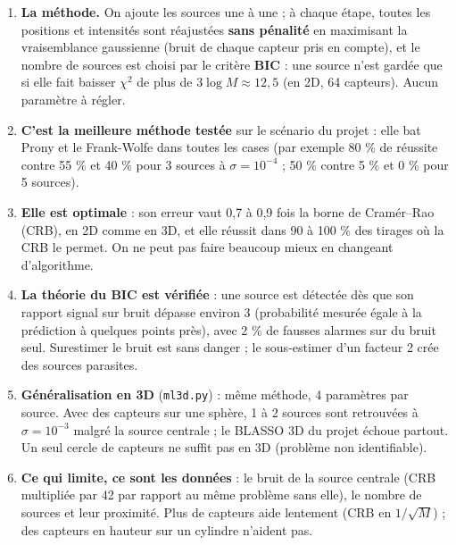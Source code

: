 \documentclass[
  french,
]{article}
\providecommand{\tightlist}{%
  \setlength{\itemsep}{0pt}\setlength{\parskip}{0pt}}
\begin{document}
\begin{enumerate}
\def\labelenumi{\arabic{enumi}.}
\tightlist
\item
  \textbf{La méthode.} On ajoute les sources une à une ; à chaque étape,
  toutes les positions et intensités sont réajustées \textbf{sans
  pénalité} en maximisant la vraisemblance gaussienne (bruit de chaque
  capteur pris en compte), et le nombre de sources est choisi par le
  critère \textbf{BIC} : une source n'est gardée que si elle fait
  baisser \(\chi^2\) de plus de \(3\log M\approx 12{,}5\) (en 2D, 64
  capteurs). Aucun paramètre à régler.
\item
  \textbf{C'est la meilleure méthode testée} sur le scénario du projet :
  elle bat Prony et le Frank-Wolfe dans toutes les cases (par exemple 80
  \% de réussite contre 55 \% et 40 \% pour 3 sources à
  \(\sigma = 10^{-4}\) ; 50 \% contre 5 \% et 0 \% pour 5 sources).
\item
  \textbf{Elle est optimale} : son erreur vaut 0,7 à 0,9 fois la borne
  de Cramér--Rao (CRB), en 2D comme en 3D, et elle réussit dans 90 à 100
  \% des tirages où la CRB le permet. On ne peut pas faire beaucoup
  mieux en changeant d'algorithme.
\item
  \textbf{La théorie du BIC est vérifiée} : une source est détectée dès
  que son rapport signal sur bruit dépasse environ 3 (probabilité
  mesurée égale à la prédiction à quelques points près), avec 2 \% de
  fausses alarmes sur du bruit seul. Surestimer le bruit est sans danger
  ; le sous-estimer d'un facteur 2 crée des sources parasites.
\item
  \textbf{Généralisation en 3D} (\texttt{ml3d.py}) : même méthode, 4
  paramètres par source. Avec des capteurs sur une sphère, 1 à 2 sources
  sont retrouvées à \(\sigma = 10^{-3}\) malgré la source centrale ; le
  BLASSO 3D du projet échoue partout. Un seul cercle de capteurs ne
  suffit pas en 3D (problème non identifiable).
\item
  \textbf{Ce qui limite, ce sont les données} : le bruit de la source
  centrale (CRB multipliée par 42 par rapport au même problème sans
  elle), le nombre de sources et leur proximité. Plus de capteurs aide
  lentement (CRB en \(1/\sqrt M\)) ; des capteurs en hauteur sur un
  cylindre n'aident pas.
\end{enumerate}
\end{document}

